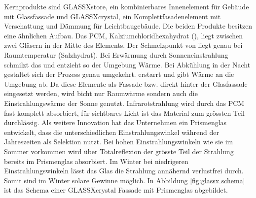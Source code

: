 \documentclass[11pt,a4paper]{scrartcl}
\begin{document}
Kernprodukte sind
GLASSX\circledR store, ein kombinierbares Innenelement für Gebäude mit
Glassfassade und GLASSX\circledR crystal, ein Komplettfasadenelement mit
Verschattung und Dämmung für Leichtbaugebäude. Die beiden Produkte besitzen eine
ähnlichen Aufbau. Das PCM, Kalziumchloridhexahydrat (),
liegt zwischen zwei Gläsern in der Mitte des Elements. Der Schmelzpunkt von
 liegt genau bei Raumtemperatur (Salzhydrat). Bei
Erwärmung durch Sonneneinstrahlung schmilzt das  und
entzieht so der Umgebung Wärme. Bei Abkühlung in der Nacht gestaltet sich der
Prozess genau umgekehrt.  erstarrt und gibt Wärme an die
Umgebung ab. Da diese Elemente als Fassade bzw. direkt hinter der Glasfassade
eingesetzt werden, wird bicht nur Raumwärme sondern auch die Einstrahlungswärme
der Sonne genutzt. Infrarotstrahlung wird durch das PCM fast komplett
absorbiert, für sichtbares Licht ist das Material zum grössten Teil durchlässig.
Als weitere Innovation hat das Unternehmen ein Prismenglas entwickelt, dass die
unterschiedlichen Einstrahlungswinkel während der Jahreszeiten als Selektion
nutzt. Bei hohen Einstrahlungswinkeln wie sie im Sommer vorkommen wird über
Totalreflexion der grösste Teil der Strahlung bereits im Prismenglas absorbiert.
Im Winter bei niedrigeren Einstrahlungswinkeln lässt das Glas die Strahlung
annähernd verlustfrei durch. Somit sind im Winter solare Gewinne möglich. In
Abbildung \ref{fig:glassx schema} ist das Schema einer GLASSX\circledR crystal
Fassade mit Prismenglas abgebildet. 
\end{document}
